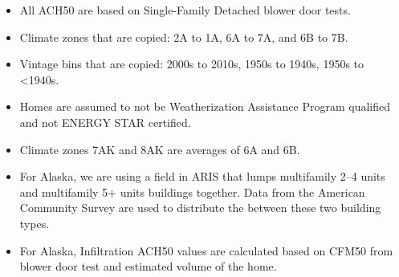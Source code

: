 \begin{itemize}
 
\item
  All ACH50 are based on Single-Family Detached blower door tests.
\item
  Climate zones that are copied: 2A to 1A, 6A to 7A, and 6B to 7B.
\item
  Vintage bins that are copied: 2000s to 2010s, 1950s to 1940s, 1950s to
  \textless1940s.
\item
  Homes are assumed to not be Weatherization Assistance Program
  qualified and not ENERGY STAR certified.
\item
  Climate zones 7AK and 8AK are averages of 6A and 6B.
\item
  For Alaska, we are using a field in ARIS that lumps multifamily 2--4
  units and multifamily 5+ units buildings together. Data from the
  American Community Survey are used to distribute the between these two
  building types.
\item
  For Alaska, Infiltration ACH50 values are calculated based on CFM50
  from blower door test and estimated volume of the home.
\end{itemize}










